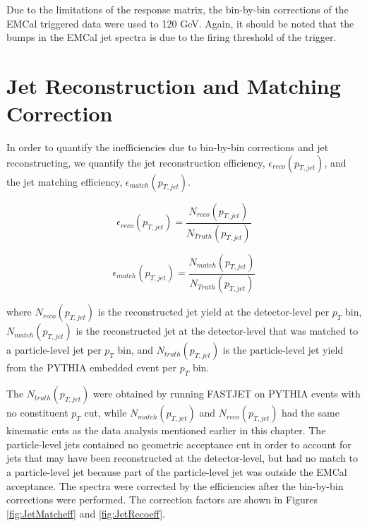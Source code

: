 Due to the limitations of the response matrix, the bin-by-bin corrections of the EMCal triggered data were used to 120 GeV.  Again, it should be noted that the bumps in the EMCal jet spectra is due to the firing threshold of the trigger.

\section{Jet Reconstruction and Matching Correction}
In order to quantify the inefficiencies due to bin-by-bin corrections and jet reconstructing, we quantify the jet reconstruction efficiency, $\epsilon_{reco} (p_{T, jet})$, and the jet matching efficiency, $\epsilon_{match} (p_{T, jet})$.


\begin{equation}
 \epsilon_{reco} (p_{T, jet}) = \frac{N_{reco}(p_{T, jet}) }{N_{Truth} (p_{T, jet})}
\label{eq:jetrecoeff}
\end{equation}

\begin{equation}
 \epsilon_{match} (p_{T, jet}) = \frac{N_{match}(p_{T, jet}) }{N_{Truth}(p_{T, jet})}
\label{eq:jetmatchoeff}
\end{equation}


\noindent 
where $N_{reco} (p_{T, jet})$ is the reconstructed jet yield at the detector-level per $p_{T}$ bin, $N_{match}(p_{T, jet})$ is the reconstructed jet at the detector-level that was matched to a particle-level jet per $p_{T}$ bin, and $N_{truth} (p_{T, jet})$ is the particle-level jet yield from the PYTHIA embedded event per $p_{T}$ bin.  

The $N_{truth} (p_{T, jet})$ were obtained by running FASTJET on PYTHIA events with no constituent $p_{T}$ cut, while $N_{match}(p_{T, jet})$ and $N_{reco} (p_{T, jet})$ had the same kinematic cuts as the data analysis mentioned earlier in this chapter.  The particle-level jets contained no geometric acceptance cut in order to account for jets that may have been reconstructed at the detector-level, but had no match to a particle-level jet because part of the particle-level jet was outside the EMCal acceptance.  The spectra were corrected by the efficiencies after the bin-by-bin corrections were performed.  The correction factors are shown in Figures \ref{fig:JetMatcheff} and \ref{fig:JetRecoeff}.

